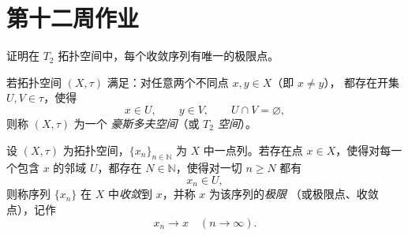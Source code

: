 \section{第十二周作业}
\begin{homework}[5.1]
证明在 $T_2$ 拓扑空间中，每个收敛序列有唯一的极限点。
\end{homework}
\begin{definition}[豪斯多夫空间 / $T_2$ 空间]
若拓扑空间 $(X,\tau)$ 满足：对任意两个不同点 $x,y\in X$（即 $x\neq y$），
都存在开集 $U,V\in\tau$，使得
\[
x\in U,\qquad y\in V,\qquad U\cap V=\varnothing,
\]
则称 $(X,\tau)$ 为一个 \emph{豪斯多夫空间}（或 \emph{$T_2$ 空间}）。
\end{definition}
\begin{definition}[拓扑空间中序列的极限]
设 $(X,\tau)$ 为拓扑空间，$\{x_n\}_{n\in\mathbb N}$ 为 $X$ 中一点列。若存在点
$x\in X$，使得对每一个包含 $x$ 的邻域 $U$，都存在 $N\in\mathbb N$，使得对一切
$n\ge N$ 都有
\[
x_n\in U,
\]
则称序列 $\{x_n\}$ 在 $X$ 中\emph{收敛}到 $x$，并称 $x$ 为该序列的\emph{极限}
（或极限点、收敛点），记作
\[
x_n \to x\quad (n\to\infty).
\]
\end{definition}

